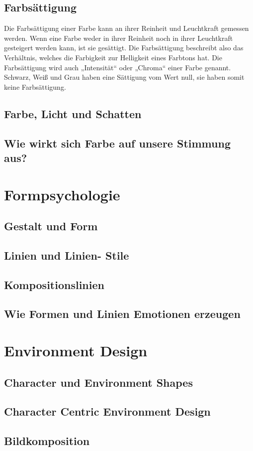 \subsection{Farbsättigung}
Die Farbsättigung einer Farbe kann an ihrer Reinheit und Leuchtkraft gemessen werden. Wenn eine Farbe weder in ihrer Reinheit noch in ihrer Leuchtkraft gesteigert werden kann, ist sie gesättigt. Die Farbsättigung beschreibt also das Verhältnis, welches die Farbigkeit zur Helligkeit eines Farbtons hat. Die Farbsättigung wird auch „Intensität“ oder „Chroma“ einer Farbe genannt. Schwarz, Weiß und Grau haben eine Sättigung vom Wert null, sie haben somit keine Farbsättigung.

\subsection{Farbe, Licht und Schatten}

\subsection{Wie wirkt sich Farbe auf unsere Stimmung aus?}



\section{Formpsychologie}

\subsection{Gestalt und Form}

\subsection{Linien und Linien- Stile}

\subsection{Kompositionslinien}

\subsection{Wie Formen und Linien Emotionen erzeugen}



\section{Environment Design}

\subsection{Character und Environment Shapes}

\subsection{Character Centric Environment Design }

\subsection{Bildkomposition}






